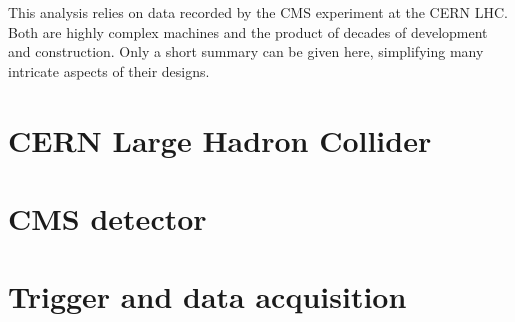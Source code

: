 This analysis relies on data recorded by the CMS experiment at the CERN LHC. Both are highly complex machines and the product of decades of development and construction. Only a short summary can be given here, simplifying many intricate aspects of their designs.
\section{CERN Large Hadron Collider}

\section{CMS detector}

\section{Trigger and data acquisition}
\label{sec:trigger}

